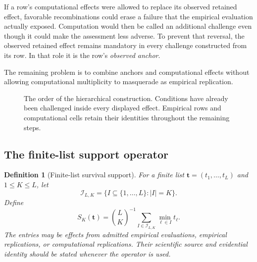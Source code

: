 \documentclass[11pt]{article}
\newtheorem{definition}{Definition}
\theoremstyle{remark}
\begin{document}
If a row's computational effects were allowed to replace its observed retained
effect, favorable recombinations could erase a failure that the empirical
evaluation actually exposed. Computation would then be called an additional
challenge even though it could make the assessment less adverse. To prevent
that reversal, the observed retained effect remains mandatory in every
challenge constructed from its row. In that role it is the row's
\emph{observed anchor}.

The remaining problem is to combine anchors and computational effects without
allowing computational multiplicity to masquerade as empirical replication.

\begin{figure}[htbp]
\centering
{}
\caption{The order of the hierarchical construction. Conditions have already
been challenged inside every displayed effect. Empirical rows and
computational cells retain their identities throughout the remaining steps.}
\label{fig:hierarchy-schematic}
\end{figure}

\subsection{The finite-list support operator}

\begin{definition}[Finite-list survival support]
\label{def:support}
For a finite list $\mathbf t=(t_1,\ldots,t_L)$ and $1\leq K\leq L$, let
\[
\mathcal I_{L,K}
=
\{I\subseteq\{1,\ldots,L\}:|I|=K\}.
\]
Define
\begin{equation}
S_K(\mathbf t)
=
\binom{L}{K}^{-1}
\sum_{I\in\mathcal I_{L,K}}
\min_{\ell\in I}t_\ell.
\label{eq:finite-list-support}
\end{equation}
The entries may be effects from admitted empirical evaluations, empirical
replications, or computational replications. Their scientific source and
evidential identity should be stated whenever the operator is used.
\end{definition}
\end{document}
